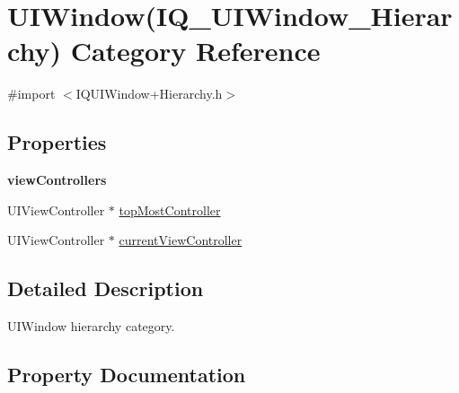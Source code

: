 \hypertarget{category_u_i_window_07_i_q___u_i_window___hierarchy_08}{}\section{U\+I\+Window(I\+Q\+\_\+\+U\+I\+Window\+\_\+\+Hierarchy) Category Reference}
\label{category_u_i_window_07_i_q___u_i_window___hierarchy_08}


{\ttfamily \#import $<$I\+Q\+U\+I\+Window+\+Hierarchy.\+h$>$}

\subsection*{Properties}
\begin{Indent}\textbf{ view\+Controllers}\par
{\em 

 

 }\begin{DoxyCompactItemize}
\item 
U\+I\+View\+Controller $\ast$ \mbox{\hyperlink{category_u_i_window_07_i_q___u_i_window___hierarchy_08_ac917e7ab478546f2cc7be2bfae4afde5}{top\+Most\+Controller}}
\item 
U\+I\+View\+Controller $\ast$ \mbox{\hyperlink{category_u_i_window_07_i_q___u_i_window___hierarchy_08_a2ea3404060d15e17f22273acfcae8849}{current\+View\+Controller}}
\end{DoxyCompactItemize}
\end{Indent}


\subsection{Detailed Description}
U\+I\+Window hierarchy category. 

\subsection{Property Documentation}
\mbox{\label{category_u_i_window_07_i_q___u_i_window___hierarchy_08_a2ea3404060d15e17f22273acfcae8849}} 

